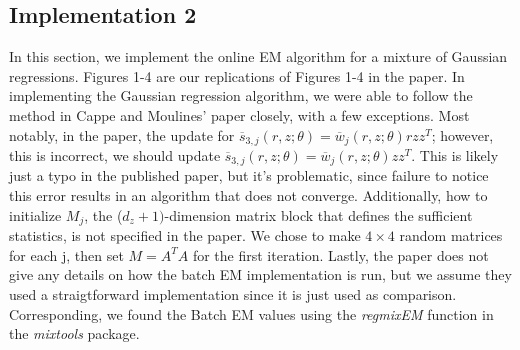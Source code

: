 \documentclass[12pt]{article}
\begin{document}
\subsection{Implementation 2}
In this section, we implement the online EM algorithm for a mixture of Gaussian regressions. Figures 1-4 are our replications of Figures 1-4 in the paper. In implementing the Gaussian regression  algorithm, we were able to follow the method in Cappe and Moulines' paper closely, with a few exceptions. Most notably, in the paper, the update for $\overline{s}_{3,j}(r,z;\theta) = \overline{w}_{j}(r,z;\theta)rzz^{T}$; however, this is incorrect, we should update $\overline{s}_{3,j}(r,z;\theta) = \overline{w}_{j}(r,z;\theta)zz^{T}$. This is likely just a typo in the published paper, but it's problematic, since failure to notice this error results in an algorithm that does not converge. Additionally, how to  initialize $M_{j}$, the ($d_{z} + 1)$-dimension matrix block that defines the sufficient statistics, is not specified in the paper. We chose to make $4 \times 4$ random matrices for each j, then set $M = A^{T}A$ for the first iteration. Lastly, the paper does not give any details on how the batch EM implementation is run, but we assume they used a straigtforward implementation since it is just used as comparison. Corresponding, we found the Batch EM values using the  \textit{regmixEM} function in the \textit{mixtools} package. \\



\end{document}
